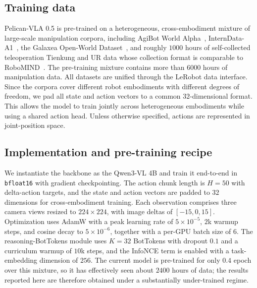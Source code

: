 \documentclass[a4paper,table]{extarticle}
\begin{document}
\subsection{Training data}
\label{sec:exp:data}
Pelican-VLA 0.5 is pre-trained on a heterogeneous, cross-embodiment mixture of large-scale manipulation corpora, including AgiBot World Alpha~\cite{agibot-world-colosseo_2025}, InternData-A1~\cite{interndata-a1_2025}, the Galaxea Open-World Dataset~\cite{galaxea-open-world-dataset-g0_2025}, and roughly $1000$ hours of self-collected teleoperation Tienkung and UR data whose collection format is comparable to RoboMIND~\cite{robomind_2025}. The pre-training mixture contains more than $6000$ hours of manipulation data. All datasets are unified through the LeRobot data interface. Since the corpora cover different robot embodiments with different degrees of freedom, we pad all state and action vectors to a common $32$-dimensional format. This allows the model to train jointly across heterogeneous embodiments while using a shared action head. Unless otherwise specified, actions are represented in joint-position space.


\subsection{Implementation and pre-training recipe}
\label{sec:method:impl}
We instantiate the backbone as the Qwen3-VL 4B and train it end-to-end in \verb|bfloat16| with gradient checkpointing. The action chunk length is $H{=}50$ with delta-action targets, and the state and action vectors are padded to $32$ dimensions for cross-embodiment training. Each observation comprises three camera views resized to $224{\times}224$, with image deltas of $[-15,0,15]$. Optimization uses AdamW with a peak learning rate of $5{\times}10^{-5}$, $2$k warmup steps, and cosine decay to $5{\times}10^{-6}$, together with a per-GPU batch size of $6$. The reasoning-BotTokens module uses $K{=}32$ BotTokens with dropout $0.1$ and a curriculum warmup of $10$k steps, and the InfoNCE term is enabled with a task-embedding dimension of $256$. The current model is pre-trained for only $0.4$ epoch over this mixture, so it has effectively seen about $2400$ hours of data; the results reported here are therefore obtained under a substantially under-trained regime. 
\end{document}
